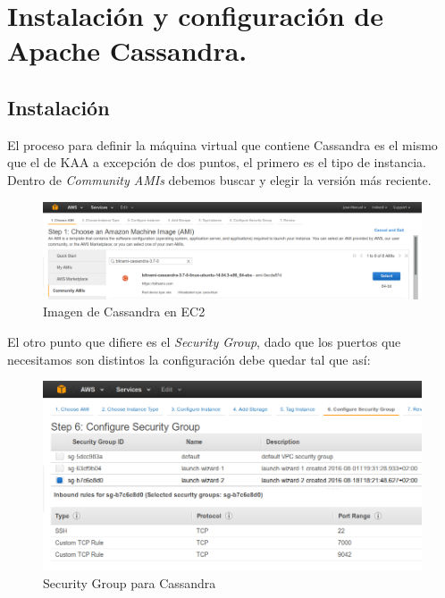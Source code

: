 \newpage

\newpage
\newpage
\newpage

\section{Instalación y configuración de Apache Cassandra.}

\subsection{Instalación}

El proceso para definir la máquina virtual que contiene Cassandra es el mismo que el de KAA a excepción de dos puntos, el primero es el tipo de instancia. Dentro de \textit{Community AMIs} debemos buscar  y elegir la versión más reciente.

\begin{figure}[!ht]
  \begin{center}
    \includegraphics[scale=0.30]{../images/cassandra/1.png}
		\caption{Imagen de Cassandra en EC2}
    \label{fig:kaa}
	\end{center}
\end{figure}

El otro punto que difiere es el \textit{Security Group}, dado que los puertos que necesitamos son distintos la configuración debe quedar tal que así:

\begin{figure}[!ht]
  \begin{center}
    \includegraphics[scale=0.30]{../images/cassandra/2.png}
		\caption{Security Group para Cassandra}
    \label{fig:kaa}
	\end{center}
\end{figure}

